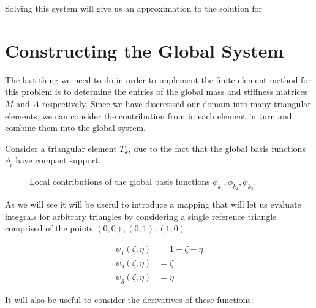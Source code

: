 Solving this system will give us an approximation to the solution for

\section{Constructing the Global System}

The last thing we need to do in order to implement the finite element method
for this problem is to determine the entries of the global mass and stiffness
matrices $M$ and $A$ respectively. Since we have discretised our domain into
many triangular elements, we can consider the contribution from in each element
in turn and combine them into the global system.

Consider a triangular element $T_k$, due to the fact that the global basis
functions $\phi_i$ have compact support,

\begin{figure}
\centering
\begin{subfigure}[b]{0.30\textwidth}
    \centering
    \resizebox{\linewidth}{!}{}
\end{subfigure}
\begin{subfigure}[b]{0.30\textwidth}
    \centering
    \resizebox{\linewidth}{!}{}
\end{subfigure}
\begin{subfigure}[b]{0.30\textwidth}
    \centering
    \resizebox{\linewidth}{!}{}
\end{subfigure}
\caption{Local contributions of the global basis functions
         $\phi_{k_1}, \phi_{k_2}, \phi_{k_3}$.}
\end{figure}

As we will see it will be useful to introduce a mapping that will let us
evaluate integrals for arbitrary triangles by considering a single reference
triangle comprised of the points $(0,0), (0,1), (1,0)$

\begin{align}\label{eq:master_basis_functions}
    \psi_1(\zeta, \eta) &= 1 - \zeta - \eta \\
    \psi_2(\zeta, \eta) &= \zeta \\
    \psi_3(\zeta, \eta) &= \eta
\end{align}

It will also be useful to consider the derivatives of these functions:


